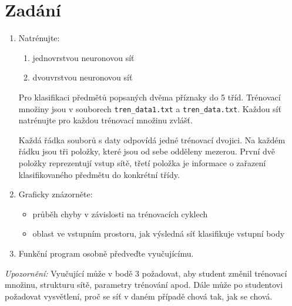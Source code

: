 \section{Zadání}
\begin{enumerate}
	\item Natrénujte:
	      \begin{enumerate}
		      \item jednovrstvou neuronovou síť
		      \item dvouvrstvou neuronovou síť
	      \end{enumerate}
	      Pro klasifikaci předmětů popsaných dvěma příznaky do 5 tříd.
	      Trénovací množiny jsou v souborech \texttt{tren\_data1.txt} a \texttt{tren\_data.txt}.
	      Každou síť natrénujte pro každou trénovací množinu zvlášť.

	      Každá řádka souborů s daty odpovídá jedné trénovací dvojici.
	      Na každém řádku jsou tři položky, které jsou od sebe odděleny mezerou.
	      První dvě položky reprezentují vstup sítě, třetí položka je informace o zařazení klasifikovaného předmětu do konkrétní třídy.
	\item Graficky znázorněte:
	      \begin{itemize}
		      \item průběh chyby v závislosti na trénovacích cyklech
		      \item oblast ve vstupním prostoru, jak výsledná síť klasifikuje vstupní body
	      \end{itemize}
	\item Funkční program osobně předveďte vyučujícímu.
\end{enumerate}

\emph{Upozornění:}
Vyučující může v bodě 3 požadovat, aby student změnil trénovací množinu, strukturu sítě, parametry trénování apod.
Dále může po studentovi požadovat vysvětlení, proč se síť v daném případě chová tak, jak se chová.
